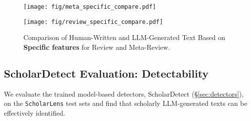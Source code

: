 

\begin{figure}[t]
    \centering
    \begin{minipage}{0.55\linewidth}
        \centering
        \texttt{[image: fig/meta\_specific\_compare.pdf]}
        \captionsetup{font=footnotesize}
    \end{minipage}
    \hfill
    \begin{minipage}{0.4\linewidth}
        \centering
        \texttt{[image: fig/review\_specific\_compare.pdf]}
        \captionsetup{font=footnotesize}
    \end{minipage}
    \hfill
    \caption{Comparison of Human-Written and LLM-Generated Text Based on \textbf{Specific features} for Review and Meta-Review.}
    \label{fig:compare_specific}
\end{figure}

\subsection{ScholarDetect Evaluation: Detectability}
\label{sec:ScholarDetect Evaluation}
We evaluate the trained model-based detectors, ScholarDetect (\S\ref{sec:detectors}), on the \texttt{ScholarLens} test sets and find that scholarly LLM-generated texts can be effectively identified.




